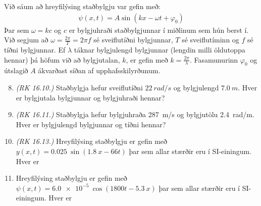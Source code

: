 \begin{tcolorbox}
Við sáum að hreyfilýsing staðbylgju var gefin með:
\begin{align*}
    \psi(x,t) = A\sin(kx - \omega t + \varphi_0)
\end{align*}
Þar sem $\omega = kc$ og $c$ er bylgjuhraði staðbylgjunnar í miðlinum sem hún berst í. Við segjum að $\omega = \frac{2\pi}{T} = 2\pi f$ sé sveiflutíðni bylgjunnar, $T$ sé sveiflutíminn og $f$ sé tíðni bylgjunnar. Ef $\lambda$ táknar bylgjulengd bylgjunnar (lengdin milli öldutoppa hennar) þá höfum við að bylgjutalan, $k$, er gefin með $k = \frac{2\pi}{\lambda}$. Fasamunurinn $\varphi_0$ og útslagið $A$ ákvarðast síðan af upphafsskilyrðunum.
\end{tcolorbox}

\begin{enumerate}[label = \textbf{Dæmi \thechapter.\arabic*.}]

\setcounter{enumi}{7}

\item \textit{(RK 16.10.)} Staðbylgja hefur sveiflutíðni $\SI{22}{rad/s}$ og bylgjulengd $\SI{7.0}{m}$. Hver er bylgjutala bylgjunnar og bylgjuhraði hennar?

\item \textit{(RK 16.11.)} Staðbylgja hefur bylgjuhraða \SI{287}{m/s} og bylgjutölu \SI{2.4}{rad/m}. Hver er bylgjulengd bylgjunnar og tíðni hennar?

\item \textit{(RK 16.13.)} Hreyfilýsing staðbylgju er gefin með $y(x,t) = \SI{0.025}{}\sin(\SI{1.8}{}x-66t)$ þar sem allar stærðir eru í SI-einingum. Hver er 

\item Hreyfilýsing staðbylgju er gefin með $\psi(x,t) = \SI{6.0e-5}{}\cos( 1800 t - \SI{5.3}{}x)$ þar sem allar stærðir eru í SI-einingum. Hver er 


\end{enumerate}
